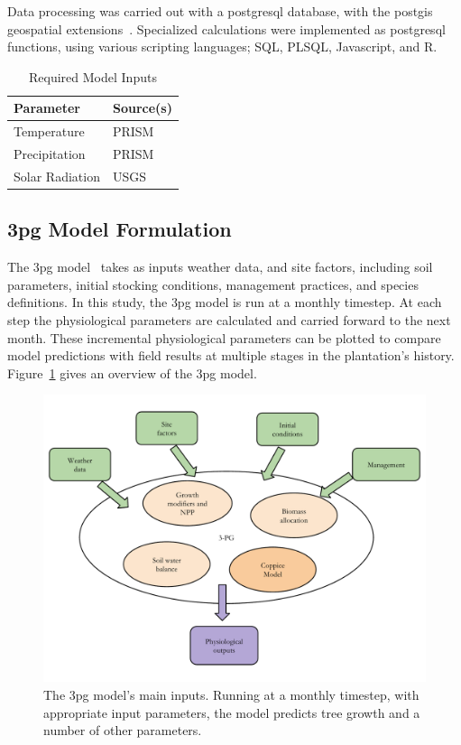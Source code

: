 \documentclass[preprint,12pt]{elsarticle}
\begin{document}
Data processing was carried out with a postgresql database, with the
postgis geospatial extensions~\cite{pgsql,Holl2009,postgis}.
Specialized calculations were implemented as postgresql functions, using
various scripting languages; SQL, PLSQL, Javascript, and R.

\begin{table}
  \centering
  \begin{tabular}[hp]{|l|l|}
    \hline
    Parameter & Source(s) \\
    \hline
    Temperature & \acs{PRISM} \\
    Precipitation & \acs{PRISM} \\
    Solar Radiation & \ac{USGS} \\
    \hline
  \end{tabular}
  \caption{Required Model Inputs}
  \label{tab:input}
\end{table}
\subsection{\acs{3pg} Model Formulation}
\label{sec:3pg}

The \acf{3pg} model~\cite{Landsberg1997, landsberg2010physiological,
  Sands2004} takes as inputs weather data, and site factors, including
soil parameters, initial stocking conditions, management practices,
and species definitions.  In this study, the \ac{3pg} model is run at
a monthly timestep. At each step the physiological parameters are
calculated and carried forward to the next month.  These incremental
physiological parameters can be plotted to compare model predictions
with field results at multiple stages in the plantation’s history.
Figure~\ref{fig:overview} gives an overview of the \acf{3pg} model.

\begin{figure}[p]
\includegraphics[width=\linewidth]{model_overview}
\caption{ The \ac{3pg} model's main inputs.  Running at a monthly timestep, with
appropriate input parameters, the model predicts tree growth and a
number of other parameters.}
\label{fig:overview}
\end{figure}
\end{document}
